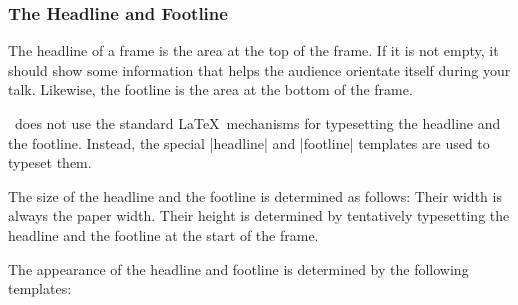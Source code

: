 \subsubsection{The Headline and Footline}

The headline of a frame is the area at the top of the frame. If it is not empty, it should show some information that helps the audience orientate itself during your talk. Likewise, the footline is the area at the bottom of the frame.

\beamer\ does not use the standard \LaTeX\ mechanisms for typesetting the headline and the footline. Instead, the special |headline| and |footline| templates are used to typeset them.

The size of the headline and the footline is determined as follows: Their width is always the paper width. Their height is determined by tentatively typesetting the headline and the footline at the start of the frame.

The appearance of the headline and footline is determined by the following templates:

